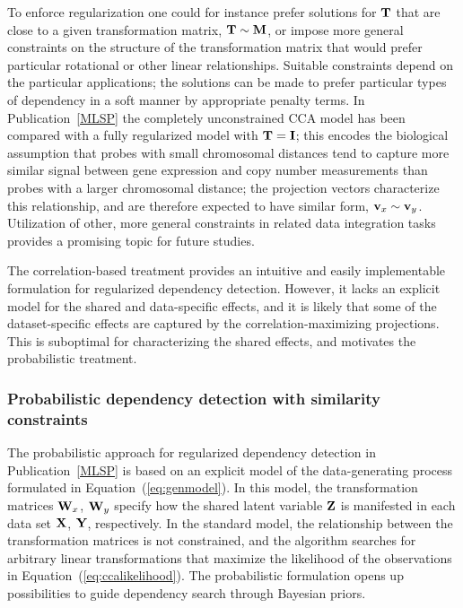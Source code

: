 To enforce regularization one could for instance prefer solutions for
\(\mathbf{T}\) that are close to a given transformation matrix, \(\mathbf{T} \sim
\mathbf{M}\), or impose more general constraints on the structure of the
transformation matrix that would prefer particular rotational or other
linear relationships. Suitable constraints depend on the particular
applications; the solutions can be made to prefer particular types of
dependency in a soft manner by appropriate penalty terms. In
Publication~\ref{MLSP} the completely unconstrained CCA model has been
compared with a fully regularized model with \(\mathbf{T} = \mathbf{I}\); this encodes
the biological assumption that probes with small chromosomal distances
tend to capture more similar signal between gene expression and copy
number measurements than probes with a larger chromosomal distance;
the projection vectors characterize this relationship, and are
therefore expected to have similar form, \(\mathbf{v}_x \sim \mathbf{v}_y\). Utilization
of other, more general constraints in related data integration tasks
provides a promising topic for future studies.

The correlation-based treatment provides an intuitive and easily
implementable formulation for regularized dependency
detection. However, it lacks an explicit model for the shared and
data-specific effects, and it is likely that some of the
dataset-specific effects are captured by the correlation-maximizing
projections. This is suboptimal for characterizing the shared effects,
and motivates the probabilistic treatment.

\subsubsection{Probabilistic dependency detection with similarity constraints}

The probabilistic approach for regularized dependency detection in
Publication~\ref{MLSP} is based on an explicit model of the
data-generating process formulated in Equation~(\ref{eq:genmodel}). In
this model, the transformation matrices \(\mathbf{W}_x\), \(\mathbf{W}_y\) specify how
the shared latent variable \(\mathbf{Z}\) is manifested in each data set
\(\mathbf{X}\), \(\mathbf{Y}\), respectively. In the standard model, the relationship
between the transformation matrices is not constrained, and the
algorithm searches for arbitrary linear transformations that maximize
the likelihood of the observations in
Equation~(\ref{eq:ccalikelihood}). The probabilistic formulation opens
up possibilities to guide dependency search through Bayesian priors.

